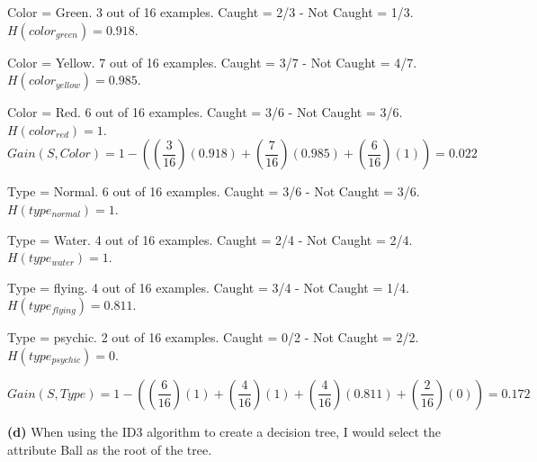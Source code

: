 \documentclass[11pt]{article}
\renewcommand\part[1]{\vspace{.10in}\textbf{(#1)}}
\begin{document}
 \par

Color = Green. 3 out of 16 examples. Caught = 2/3 - Not Caught = 1/3. $H(color_{green}) = 0.918$.

Color = Yellow. 7 out of 16 examples. Caught = 3/7 - Not Caught = 4/7. $H(color_{yellow}) = 0.985$.

Color = Red. 6 out of 16 examples. Caught = 3/6 - Not Caught = 3/6. $H(color_{red}) = 1$.
$$Gain(S, Color) = 1 - ((\frac{3}{16})(0.918) + (\frac{7}{16})(0.985) + (\frac{6}{16})(1)) = 0.022$$

 \par 

Type = Normal. 6 out of 16 examples. Caught = 3/6 - Not Caught = 3/6. $H(type_{normal}) = 1$.

Type = Water. 4 out of 16 examples. Caught = 2/4 - Not Caught = 2/4. $H(type_{water}) = 1$.

Type = flying. 4 out of 16 examples. Caught = 3/4 - Not Caught = 1/4. $H(type_{flying}) = 0.811$.

Type = psychic. 2 out of 16 examples. Caught = 0/2 - Not Caught = 2/2. $H(type_{psychic}) = 0$.

$$Gain(S, Type) = 1 - ((\frac{6}{16})(1) + (\frac{4}{16})(1) + (\frac{4}{16})(0.811) + (\frac{2}{16})(0)) = 0.172$$

 \par 

\part{d} When using the ID3 algorithm to create a decision tree, I would select the attribute Ball as the root of the tree.

\setlength{\fboxsep}{4pt}
 \par 
\newpage
\end{document}
